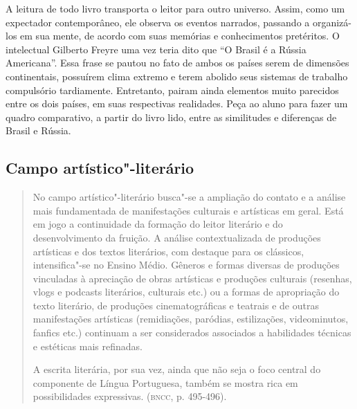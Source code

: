 \documentclass[12pt]{extarticle}
\begin{document}
A leitura de todo livro transporta o leitor para outro universo.
Assim, como um expectador contemporâneo, ele observa os eventos
narrados, passando a organizá-los em sua mente, de acordo com suas
memórias e conhecimentos pretéritos. O intelectual Gilberto Freyre uma
vez teria dito que ``O Brasil é a Rússia Americana''. Essa frase se
pautou no fato de ambos os países serem de dimensões continentais,
possuírem clima extremo e terem abolido seus sistemas de trabalho
compulsório tardiamente. Entretanto, pairam ainda elementos muito
parecidos entre os dois países, em suas respectivas realidades. Peça
ao aluno para fazer um quadro comparativo, a partir do livro lido,
entre as similitudes e diferenças de Brasil e Rússia.

\subsection{Campo artístico"-literário}

\begin{quote}
No campo artístico"-literário busca"-se a ampliação do contato e a
análise mais fundamentada de manifestações culturais e artísticas em
geral. Está em jogo a continuidade da formação do leitor literário e do
desenvolvimento da fruição. A análise contextualizada de produções
artísticas e dos textos literários, com destaque para os clássicos,
intensifica"-se no Ensino Médio. Gêneros e formas diversas de produções
vinculadas à apreciação de obras artísticas e produções culturais
(resenhas, vlogs e podcasts literários, culturais etc.) ou a formas de
apropriação do texto literário, de produções cinematográficas e teatrais
e de outras manifestações artísticas (remidiações, paródias,
estilizações, videominutos, fanfics etc.) continuam a ser considerados
associados a habilidades técnicas e estéticas mais refinadas.

A escrita literária, por sua vez, ainda que não seja o foco central do
componente de Língua Portuguesa, também se mostra rica em possibilidades
expressivas. (\textsc{bncc}, p. 495-496).
\end{quote}
\end{document}
